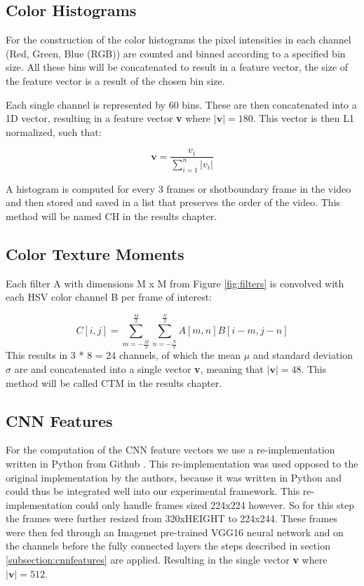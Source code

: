 \documentclass{report}
\begin{document}
\subsection{Color Histograms}
For the construction of the color histograms the pixel intensities in each channel (Red, Green, Blue (RGB)) are counted and binned according to a specified bin size. All these bins will be concatenated to result in a feature vector, the size of the feature vector is a result of the chosen bin size.

Each single channel is represented by 60 bins. These are then concatenated into a 1D vector, resulting in a feature vector \textbf{v} where $|\textbf{v}| = 180$. This vector is then L1 normalized, such that:

\[\textbf{v} = \frac{v_i}{\sum_{i=1}^{n}|v_i|}\]

A histogram is computed for every 3 frames or shotboundary frame in the video and then stored and saved in a list that preserves the order of the video. This method will be named CH in the results chapter.

\subsection{Color Texture Moments}

Each filter A with dimensions M x M from Figure \ref{fig:filters} is convolved with each HSV color channel B per frame of interest:

\[ C[i,j] = \sum_{m=-\frac{M}{2}}^{\frac{M}{2}}\sum_{n=-\frac{N}{2}}^{\frac{N}{2}} A[m, n] B[i-m, j-n] \]
This results in 3 * 8 = 24 channels, of which the mean $\mu$ and standard deviation $\sigma$ are and concatenated into a single vector \textbf{v}, meaning that $|\textbf{v}| = 48$. This method will be called CTM in the results chapter. 

\subsection{CNN Features}
For the computation of the CNN feature vectors we use a re-implementation written in Python from Github \cite{rmac-github}. This re-implementation was used opposed to the original implementation by the authors, because it was written in Python and could thus be integrated well into our experimental framework. This re-implementation could only handle frames sized 224x224 however. So for this step the frames were further resized from 320xHEIGHT to 224x244. These frames were then fed through an Imagenet pre-trained VGG16 neural network and on the channels before the fully connected layers the steps described in section \ref{subsection:cnnfeatures} are applied. Resulting in the single vector \textbf{v} where $|\textbf{v}| = 512$.
\end{document}
